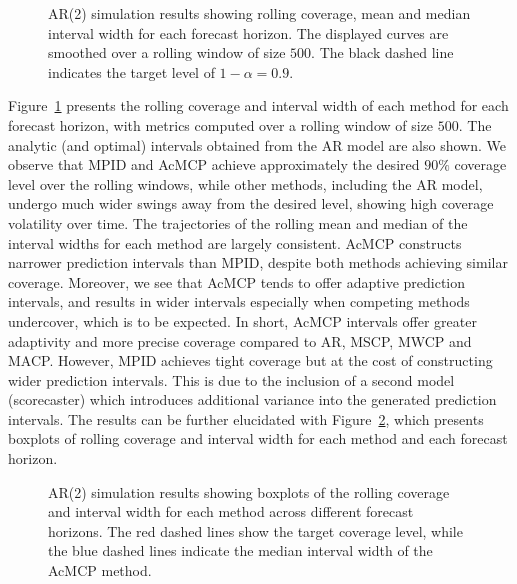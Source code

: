 \documentclass[
  11pt,
  12pt]{article}
\theoremstyle{plain}
\theoremstyle{remark}
\begin{document}
\begin{figure}


\caption{\label{fig-AR2_cov}AR(2) simulation results showing rolling
coverage, mean and median interval width for each forecast horizon. The
displayed curves are smoothed over a rolling window of size \(500\). The
black dashed line indicates the target level of \(1-\alpha=0.9\).}

\end{figure}%

Figure~\ref{fig-AR2_cov} presents the rolling coverage and interval
width of each method for each forecast horizon, with metrics computed
over a rolling window of size \(500\). The analytic (and optimal)
intervals obtained from the AR model are also shown. We observe that
MPID and AcMCP achieve approximately the desired \(90\%\) coverage level
over the rolling windows, while other methods, including the AR model,
undergo much wider swings away from the desired level, showing high
coverage volatility over time. The trajectories of the rolling mean and
median of the interval widths for each method are largely consistent.
AcMCP constructs narrower prediction intervals than MPID, despite both
methods achieving similar coverage. Moreover, we see that AcMCP tends to
offer adaptive prediction intervals, and results in wider intervals
especially when competing methods undercover, which is to be expected.
In short, AcMCP intervals offer greater adaptivity and more precise
coverage compared to AR, MSCP, MWCP and MACP. However, MPID achieves
tight coverage but at the cost of constructing wider prediction
intervals. This is due to the inclusion of a second model (scorecaster)
which introduces additional variance into the generated prediction
intervals. The results can be further elucidated with
Figure~\ref{fig-AR2_box}, which presents boxplots of rolling coverage
and interval width for each method and each forecast horizon.

\begin{figure}


\caption{\label{fig-AR2_box}AR(2) simulation results showing boxplots of
the rolling coverage and interval width for each method across different
forecast horizons. The red dashed lines show the target coverage level,
while the blue dashed lines indicate the median interval width of the
AcMCP method.}

\end{figure}%
\end{document}
